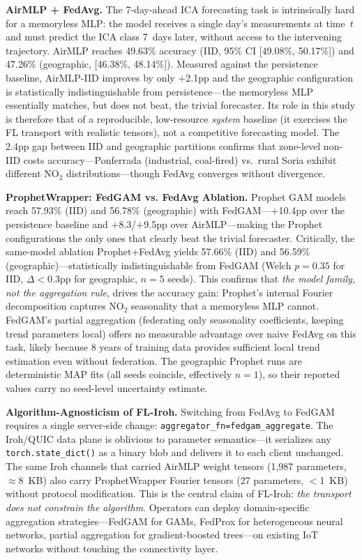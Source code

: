 \documentclass[a4paper,fleqn]{cas-dc}
\begin{document}
\textbf{AirMLP + FedAvg.} The 7-day-ahead ICA forecasting task is intrinsically hard for a memoryless MLP: the model receives a single day's measurements at time~$t$ and must predict the ICA class 7~days later, without access to the intervening trajectory. AirMLP reaches 49.63\% accuracy (IID, 95\% CI [49.08\%, 50.17\%]) and 47.26\% (geographic, [46.38\%, 48.14\%]). Measured against the persistence baseline, AirMLP-IID improves by only $+$2.1pp and the geographic configuration is statistically indistinguishable from persistence---the memoryless MLP essentially matches, but does not beat, the trivial forecaster. Its role in this study is therefore that of a reproducible, low-resource \emph{system} baseline (it exercises the FL transport with realistic tensors), not a competitive forecasting model. The 2.4pp gap between IID and geographic partitions confirms that zone-level non-IID costs accuracy---Ponferrada (industrial, coal-fired) vs.~rural Soria exhibit different NO$_2$ distributions---though FedAvg converges without divergence.

\textbf{ProphetWrapper: FedGAM vs. FedAvg Ablation.} Prophet GAM models reach 57.93\% (IID) and 56.78\% (geographic) with FedGAM---$+$10.4pp over the persistence baseline and $+$8.3/$+$9.5pp over AirMLP---making the Prophet configurations the only ones that clearly beat the trivial forecaster. Critically, the same-model ablation Prophet+FedAvg yields 57.66\% (IID) and 56.59\% (geographic)---statistically indistinguishable from FedGAM (Welch $p{=}0.35$ for IID, $\Delta{<}0.3$pp for geographic, $n{=}5$ seeds). This confirms that \emph{the model family, not the aggregation rule}, drives the accuracy gain: Prophet's internal Fourier decomposition captures NO$_2$ seasonality that a memoryless MLP cannot. FedGAM's partial aggregation (federating only seasonality coefficients, keeping trend parameters local) offers no measurable advantage over naive FedAvg on this task, likely because 8 years of training data provides sufficient local trend estimation even without federation. The geographic Prophet runs are deterministic MAP fits (all seeds coincide, effectively $n{=}1$), so their reported values carry no seed-level uncertainty estimate.

\textbf{Algorithm-Agnosticism of FL-Iroh.} Switching from FedAvg to FedGAM requires a single server-side change: \texttt{aggregator\_fn=fedgam\_aggregate}. The Iroh/QUIC data plane is oblivious to parameter semantics---it serializes any \texttt{torch.state\_dict()} as a binary blob and delivers it to each client unchanged. The same Iroh channels that carried AirMLP weight tensors (1{,}987 parameters, $\approx$8~KB) also carry ProphetWrapper Fourier tensors (27 parameters, $<$1~KB) without protocol modification. This is the central claim of FL-Iroh: \emph{the transport does not constrain the algorithm}. Operators can deploy domain-specific aggregation strategies---FedGAM for GAMs, FedProx for heterogeneous neural networks, partial aggregation for gradient-boosted trees---on existing IoT networks without touching the connectivity layer.
\end{document}
